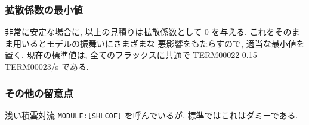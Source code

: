 \subsubsection{拡散係数の最小値}

非常に安定な場合に, 以上の見積りは拡散係数として 0 を与える.
これをそのまま用いるとモデルの振舞いにさまざまな
悪影響をもたらすので, 適当な最小値を置く.
現在の標準値は, 全てのフラックスに共通で
TERM00022 0.15 TERM00023/s である.

\subsubsection{その他の留意点}

浅い積雲対流 \texttt{MODULE:[SHLCOF]} を呼んでいるが, 
標準ではこれはダミーである.
